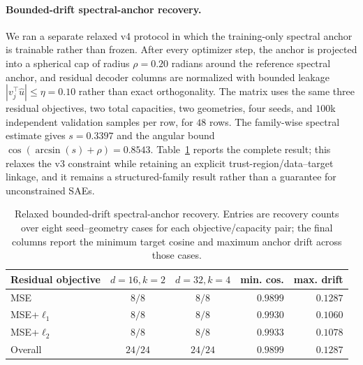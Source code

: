 \documentclass{article}
\theoremstyle{plain}
\begin{document}
{\paragraph{Bounded-drift spectral-anchor recovery.} We ran a separate relaxed v4 protocol in which the training-only spectral anchor is trainable rather than frozen. After every optimizer step, the anchor is projected into a spherical cap of radius $\rho=0.20$ radians around the reference spectral anchor, and residual decoder columns are normalized with bounded leakage $|v_j^\top\widehat u|\le\eta=0.10$ rather than exact orthogonality. The matrix uses the same three residual objectives, two total capacities, two geometries, four seeds, and $100$k independent validation samples per row, for $48$ rows. The family-wise spectral estimate gives $s=0.3397$ and the angular bound $\cos(\arcsin(s)+\rho)=0.8543$. Table~\ref{tab:bounded_drift_anchor} reports the complete result; this relaxes the v3 constraint while retaining an explicit trust-region/data--target linkage, and it remains a structured-family result rather than a guarantee for unconstrained SAEs.

\begin{table}[H]
\caption{Relaxed bounded-drift spectral-anchor recovery. Entries are recovery counts over eight seed--geometry cases for each objective/capacity pair; the final columns report the minimum target cosine and maximum anchor drift across those cases.}
\label{tab:bounded_drift_anchor}
\begin{center}
\scriptsize
\begin{tabular}{@{}lccrr@{}}
\toprule
Residual objective & $d{=}16,k{=}2$ & $d{=}32,k{=}4$ & min. cos. & max. drift \\
\midrule
MSE & $8/8$ & $8/8$ & $0.9899$ & $0.1287$ \\
MSE+$\ell_1$ & $8/8$ & $8/8$ & $0.9930$ & $0.1060$ \\
MSE+$\ell_2$ & $8/8$ & $8/8$ & $0.9933$ & $0.1078$ \\
\midrule
Overall & $24/24$ & $24/24$ & $0.9899$ & $0.1287$ \\
\bottomrule
\end{tabular}
\end{center}
\end{table}

}
\end{document}
